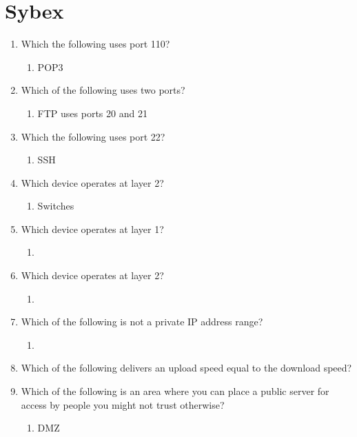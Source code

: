 \documentclass{article}
\begin{document}
\section{Sybex}
\begin{enumerate}
    \item Which the following uses port 110?
    \begin{enumerate}
        \item POP3
    \end{enumerate}
    \item Which of the following uses two ports?
    \begin{enumerate}
        \item FTP uses ports 20 and 21
    \end{enumerate}
    \item Which the following uses port 22?
    \begin{enumerate}
        \item  SSH
    \end{enumerate}
    \item Which device operates at layer 2?
    \begin{enumerate}
        \item Switches
    \end{enumerate}
    \item Which device operates at layer 1?
    \begin{enumerate}
        \item 
    \end{enumerate}
    \item Which device operates at layer 2?
    \begin{enumerate}
        \item 
    \end{enumerate}
    \item Which of the following is not a private IP address range?
    \begin{enumerate}
        \item 
    \end{enumerate}
    \item Which of the following delivers an upload speed equal to the download speed?
    \item Which of the following is an area where you can place a public server for access by people
you might not trust otherwise?
    \begin{enumerate}
        \item DMZ
    \end{enumerate}

\end{enumerate}
\end{document}
